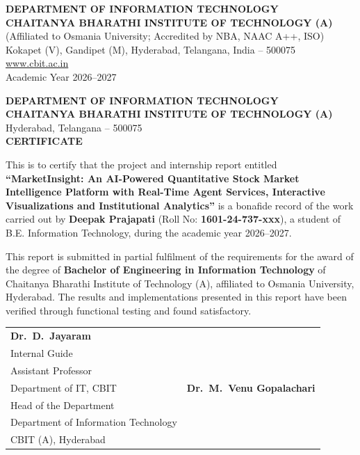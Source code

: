 \documentclass[12pt,a4paper]{report}
\begin{document}
\begin{titlepage}
{\large\bfseries DEPARTMENT OF INFORMATION TECHNOLOGY}\\[0.3cm]
{\large\bfseries CHAITANYA BHARATHI INSTITUTE OF TECHNOLOGY (A)}\\[0.3cm]
{\small (Affiliated to Osmania University; Accredited by NBA, NAAC A++, ISO)}\\
{\small Kokapet (V), Gandipet (M), Hyderabad, Telangana, India -- 500075}\\[0.2cm]
{\small \url{www.cbit.ac.in}}\\[0.3cm]
{\small Academic Year 2026--2027}

\vfill
\end{titlepage}

\clearpage
\thispagestyle{empty}
\begin{center}
  {\Large\bfseries DEPARTMENT OF INFORMATION TECHNOLOGY}\\[0.2cm]
  {\Large\bfseries CHAITANYA BHARATHI INSTITUTE OF TECHNOLOGY (A)}\\[0.2cm]
  {\small Hyderabad, Telangana -- 500075}\\[1.0cm]
  {\LARGE\bfseries\color{cbitred} CERTIFICATE}
\end{center}
\vspace{0.8cm}

\onehalfspacing
This is to certify that the project and internship report entitled \textbf{``MarketInsight: An AI-Powered Quantitative Stock Market Intelligence Platform with Real-Time Agent Services, Interactive Visualizations and Institutional Analytics''} is a bonafide record of the work carried out by \textbf{Deepak Prajapati} (Roll No: \textbf{1601-24-737-xxx}), a student of B.E. Information Technology, during the academic year 2026--2027.

This report is submitted in partial fulfilment of the requirements for the award of the degree of \textbf{Bachelor of Engineering in Information Technology} of Chaitanya Bharathi Institute of Technology (A), affiliated to Osmania University, Hyderabad. The results and implementations presented in this report have been verified through functional testing and found satisfactory.

\vspace{3.5cm}

\noindent
\begin{tabular}{p{}p{}}
  \centering
  \textbf{Dr.\ D.\ Jayaram} \\
  Internal Guide \\
  Assistant Professor \\
  Department of IT, CBIT
  &
  \centering
  \textbf{Dr.\ M.\ Venu Gopalachari} \\
  Head of the Department \\
  Department of Information Technology \\
  CBIT (A), Hyderabad
\end{tabular}
\end{document}
